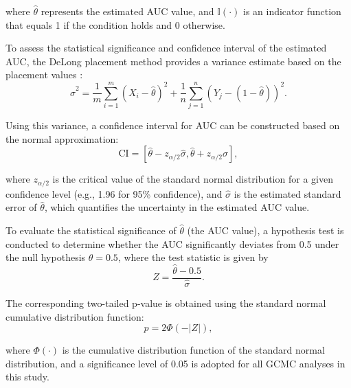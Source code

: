 \documentclass[authoryear,preprint,review,12pt]{elsarticle}
\begin{document}
\noindent where \(\hat{\theta}\) represents the estimated AUC value, and \(\mathbb{I}(\cdot)\) is an indicator function that equals 1 if the condition holds and 0 otherwise.  

To assess the statistical significance and confidence interval of the estimated AUC, the DeLong placement method provides a variance estimate based on the placement values \citep{delong1988,sun2014delongfi}:
\begin{equation}
\hat{\sigma}^2 = \frac{1}{m} \sum_{i=1}^{m} \left( X_i - \hat{\theta} \right)^2 + \frac{1}{n} \sum_{j=1}^{n} \left( Y_j - (1 - \hat{\theta}) \right)^2.
\end{equation}

Using this variance, a confidence interval for AUC can be constructed based on the normal approximation:
\begin{equation}
\text{CI} = \left[ \hat{\theta} - z_{\alpha/2} \hat{\sigma}, \hat{\theta} + z_{\alpha/2} \hat{\sigma} \right],
\end{equation}

\noindent where \( z_{\alpha/2} \) is the critical value of the standard normal distribution for a given confidence level (e.g., 1.96 for 95\% confidence), and \(\hat{\sigma} \) is the estimated standard error of \(\hat{\theta}\), which quantifies the uncertainty in the estimated AUC value.

To evaluate the statistical significance of \(\hat{\theta}\) (the AUC value), a hypothesis test is conducted to determine whether the AUC significantly deviates from 0.5 under the null hypothesis \(\theta = 0.5\), where the test statistic is given by
\begin{equation}
Z = \frac{\hat{\theta} - 0.5}{\hat{\sigma}}.
\end{equation}

The corresponding two-tailed p-value is obtained using the standard normal cumulative distribution function:
\begin{equation}
p = 2 \Phi(-|Z|),
\end{equation}

\noindent where $\Phi(\cdot)$ is the cumulative distribution function of the standard normal distribution, and a significance level of 0.05 is adopted for all GCMC analyses in this study.
\end{document}
